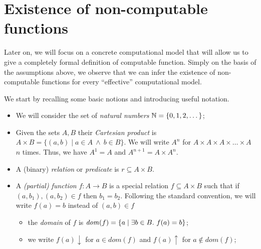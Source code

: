 \section{Existence of non-computable functions}

Later on, we will focus on a concrete computational model that will allow
us to give a completely formal definition of computable function. Simply on the basis of the assumptions above, we observe that we can infer the existence of non-computable functions for every ``effective'' computational model.

We start by recalling some basic notions and introducing useful notation.

\begin{itemize}
\item We will consider the set of \emph{natural numbers}
  $\mathbb{N} = \{ 0, 1, 2, \dots \}$;

\item Given the sets $A, B$ their \emph{Cartesian product} is
  $A \times B = \{ (a,b) \mid a \in A\ \land\ b \in B\}$. We will
  write $A^n$ for $A \times A \times A \times \ldots \times A$ $n$
  times. Thus, we have $A^1 = A$ and $ A^{n+1} = A \times A^n$.

\item A (binary) \emph{relation} or \emph{predicate} is
  $r \subseteq A \times B$.

\item A \emph{(partial) function} $f : A \to B$ is a special relation $f \subseteq A\times B$ such that if $(a, b_1), (a, b_2) \in f$ then  $b_1 = b_2$.  Following the standard convention, we will write $f(a) = b$ instead
  of $(a, b)\in f$
  \begin{itemize}
  \item the \emph{domain} of $f$ is
    $\mathit{dom}({f}) = \{a \mid \exists b \in B.\ f(a) = b \}$;

  \item we write $f(a) \downarrow$ for $a \in dom (f)$ and
    $f(a) \uparrow$ for $a \not\in dom (f)$;
  \end{itemize}


\end{itemize}
